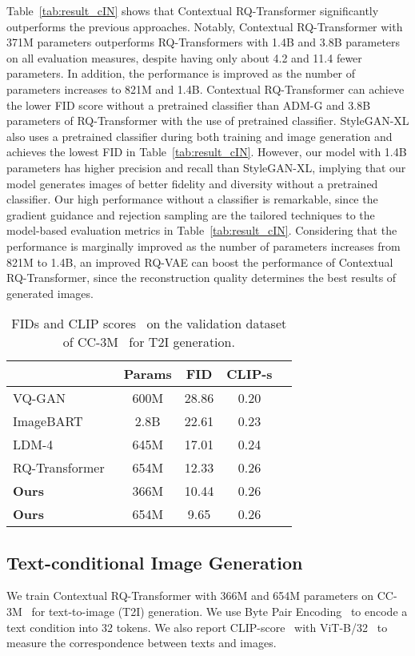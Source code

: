 \documentclass{article}
\newcommand{\ARmodel}{Contextual RQ-Transformer }
\begin{document}
Table~\ref{tab:result_cIN} shows that \ARmodel significantly outperforms the previous approaches.
Notably, \ARmodel with 371M parameters outperforms RQ-Transformers with 1.4B and 3.8B parameters on all evaluation measures, despite having only about 4.2 and 11.4 fewer parameters.
In addition, the performance is improved as the number of parameters increases to 821M and 1.4B.
\ARmodel can achieve the lower FID score without a pretrained classifier than ADM-G and 3.8B parameters of RQ-Transformer with the use of pretrained classifier. StyleGAN-XL also uses a pretrained classifier during both training and image generation and achieves the lowest FID in Table~\ref{tab:result_cIN}.
However, our model with 1.4B parameters has higher precision and recall than StyleGAN-XL, implying that our model generates images of better fidelity and diversity without a pretrained classifier.
Our high performance without a classifier is remarkable, since the gradient guidance and rejection sampling are the tailored techniques to the model-based evaluation metrics in Table~\ref{tab:result_cIN}.
Considering that the performance is marginally improved as the number of parameters increases from 821M to 1.4B, an improved RQ-VAE can boost the performance of Contextual RQ-Transformer, since the reconstruction quality determines the best results of generated images.


\begin{wraptable}[11]{r}{0.51\textwidth}
\centering
\small
\caption{FIDs and CLIP scores~\cite{CLIP} on the validation dataset of CC-3M~\cite{sharma-etal-2018-conceptual} for T2I generation.}
\label{tab:exp_cc}
\begin{tabular}{l|c|ccc}
\toprule 
     & Params & FID & CLIP-s \\ \hline
VQ-GAN~\cite{VQGAN} & 600M & 28.86 &  0.20 \\ 
ImageBART~\cite{ImageBART} & 2.8B & 22.61 & 0.23 \\ 
LDM-4~\cite{LDM} & 645M & 17.01 & 0.24 \\
RQ-Transformer~\cite{RQVAE} & 654M & 12.33 & 0.26  \\ \hline
\textbf{Ours} & 366M & 10.44 & 0.26  \\ 
\textbf{Ours} & 654M & 9.65 & 0.26 \\ 
\bottomrule
\end{tabular}
\end{wraptable}

\subsection{Text-conditional Image Generation} \label{sec:exp_text}
We train \ARmodel with 366M and 654M parameters on CC-3M~\cite{sharma-etal-2018-conceptual} for text-to-image (T2I) generation.
We use Byte Pair Encoding~\cite{sennrich2016neural,huggingface} to encode a text condition into 32 tokens.
We also report CLIP-score~\cite{CLIP} with ViT-B/32~\cite{ViT} to measure the correspondence between texts and images.
\end{document}
